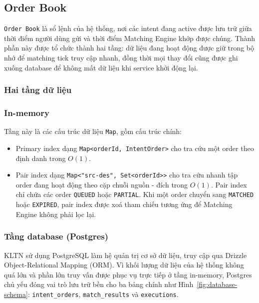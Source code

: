 
\subsection{Order Book}
\label{sec:order-book}

\texttt{Order Book} là sổ lệnh của hệ thống, nơi các intent đang active 
được lưu trữ giữa thời điểm người dùng gửi và thời điểm Matching Engine 
khớp được chúng. 
Thành phần này được tổ chức thành hai tầng: dữ liệu đang hoạt động được giữ trong bộ nhớ
để matching tick truy cập nhanh, đồng thời mọi thay đổi cũng được ghi xuống database
để không mất dữ liệu khi service khởi động lại.

\subsubsection{Hai tầng dữ liệu}

\subsubsection*{In-memory}

Tầng này là các cấu trúc dữ liệu \texttt{Map}, gồm cấu trúc chính:

\begin{itemize}
    \item Primary index dạng \texttt{Map<orderId, IntentOrder>} cho tra cứu một order theo định danh trong $O(1)$.
    \item Pair index dạng \texttt{Map<"src-des", Set<orderId>>} cho tra cứu nhanh tập order đang hoạt động theo cặp chuỗi nguồn - đích trong $O(1)$. Pair index chỉ chứa các order \texttt{QUEUED} hoặc \texttt{PARTIAL}. Khi một order chuyển sang \texttt{MATCHED} hoặc \texttt{EXPIRED}, pair index được xoá tham chiếu tương ứng để Matching Engine không phải lọc lại.
\end{itemize}

\subsubsection*{Tầng database (Postgres)}

KLTN sử dụng PostgreSQL làm hệ quản trị cơ sở dữ liệu, truy cập qua Drizzle Object-Relational Mapping (ORM). Vì khối lượng dữ liệu của
hệ thống không quá lớn và phần lớn truy vấn được phục vụ trực tiếp ở
tầng in-memory, Postgres chủ yếu đóng vai trò lưu trữ bền cho ba bảng chính như
Hình~\ref{fig:database-schema}: \texttt{intent\_orders}, \texttt{match\_results}
và \texttt{executions}.

